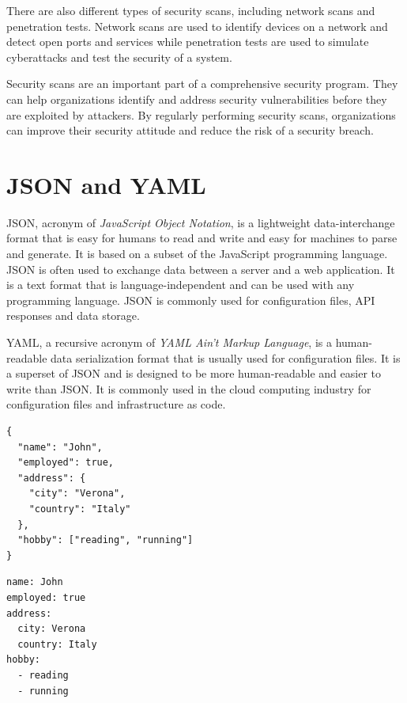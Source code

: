 There are also different types of security scans, including network scans and penetration tests. Network scans are used to identify devices on a network and detect open ports and services while penetration tests are used to simulate cyberattacks and test the security of a system.

Security scans are an important part of a comprehensive security program. They can help organizations identify and address security vulnerabilities before they are exploited by attackers. By regularly performing security scans, organizations can improve their security attitude and reduce the risk of a security breach.

\section{JSON and YAML}

JSON, acronym of \textit{JavaScript Object Notation}, is a lightweight data-interchange format that is easy for humans to read and write and easy for machines to parse and generate. It is based on a subset of the JavaScript programming language. JSON is often used to exchange data between a server and a web application. It is a text format that is language-independent and can be used with any programming language. JSON is commonly used for configuration files, API responses and data storage.

YAML, a recursive acronym of \textit{YAML Ain't Markup Language}, is a human-readable data serialization format that is usually used for configuration files. It is a superset of JSON and is designed to be more human-readable and easier to write than JSON. It is commonly used in the cloud computing industry for configuration files and infrastructure as code.

\noindent\begin{minipage}{\linewidth}
  \vspace{0.5cm}
  \begin{lstlisting}[style=json, caption={JSON example}, label={lst:json-example}]
{
  "name": "John",
  "employed": true,
  "address": {
    "city": "Verona",
    "country": "Italy"
  },
  "hobby": ["reading", "running"]
}
  \end{lstlisting}
\end{minipage}

\noindent\begin{minipage}{\linewidth}
  \vspace{0.5cm}
  \begin{lstlisting}[style=yaml, caption={YAML example}, label={lst:yaml-example}]
name: John
employed: true
address:
  city: Verona
  country: Italy
hobby:
  - reading
  - running
  \end{lstlisting}
\end{minipage}

